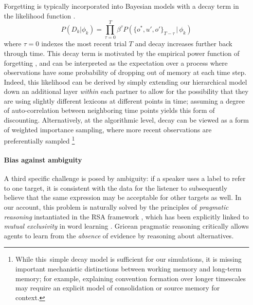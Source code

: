 Forgetting is typically incorporated into Bayesian models with a decay term in the likelihood function \cite{anderson2000adaptive,angela2009sequential,fudenberg2014recency,kalm2018visual}.
$$P(D_k | \phi_k) = \prod_{\tau=0}^T \beta^{\tau} P(\{o^*,u',o'\}_{T-\tau}\, |\, \phi_k)$$
where $\tau=0$ indexes the most recent trial $T$ and decay increases further back through time.
This decay term is motivated by the empirical power function of forgetting \cite{wixted1991form}, and can be interpreted as the expectation over a process where observations have some probability of dropping out of memory at each time step.
Indeed, this likelihood can be derived by simply extending our hierarchical model down an additional layer \emph{within} each partner to allow for the possibility that they are using slightly different lexicons at different points in time; assuming a degree of auto-correlation between neighboring time points yields this form of discounting.
Alternatively, at the algorithmic level, decay can be viewed as a form of weighted importance sampling, where more recent observations are preferentially sampled \cite{pearl2010online}\footnote{While this simple decay model is sufficient for our simulations, it is missing important mechanistic distinctions between working memory and long-term memory; for example, explaining convention formation over longer timescales may require an explicit model of consolidation or source memory for context.}

\paragraph{Bias against ambiguity}

A third specific challenge is posed by ambiguity: if a speaker uses a label to refer to one target, it is consistent with the data for the listener to subsequently believe that the same expression may be acceptable for other targets as well. 
In our account, this problem is naturally solved by the principles of \textit{pragmatic reasoning} instantiated in the RSA framework \cite{Grice75_LogicConversation}, which has been explicitly linked to \emph{mutual exclusivity} in word learning \cite{bloom2002children,FrankGoodmanTenenbaum09_Wurwur,SmithGoodmanFrank13_RecursivePragmaticReasoningNIPS,gulordava2020one,ohmerreinforcement}.
Gricean pragmatic reasoning critically allows agents to learn from the \emph{absence} of evidence by reasoning about alternatives. 

